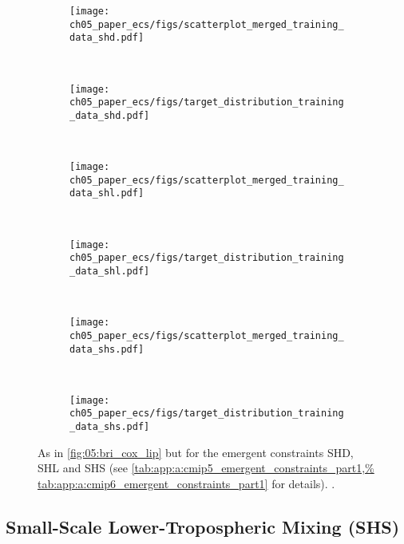\begin{figure}[!t]
  \centering
  \begin{subfigure}[b]{\SubfigureWidth{}}
    \texttt{[image: 
      ch05\_paper\_ecs/figs/scatterplot\_merged\_training\_data\_shd.pdf]}
    \caption{}
    \label{fig:05:shd_shl_shs:a}
  \end{subfigure}
  ~
  \begin{subfigure}[b]{\SubfigureWidth{}}
    \texttt{[image: 
      ch05\_paper\_ecs/figs/target\_distribution\_training\_data\_shd.pdf]}
    \caption{}
    \label{fig:05:shd_shl_shs:b}
  \end{subfigure}
  \\
  \begin{subfigure}[b]{\SubfigureWidth{}}
    \texttt{[image: 
      ch05\_paper\_ecs/figs/scatterplot\_merged\_training\_data\_shl.pdf]}
    \caption{}
    \label{fig:05:shd_shl_shs:c}
  \end{subfigure}
  ~
  \begin{subfigure}[b]{\SubfigureWidth{}}
    \texttt{[image: 
      ch05\_paper\_ecs/figs/target\_distribution\_training\_data\_shl.pdf]}
    \caption{}
    \label{fig:05:shd_shl_shs:d}
  \end{subfigure}
  \\
  \begin{subfigure}[b]{\SubfigureWidth{}}
    \texttt{[image: 
      ch05\_paper\_ecs/figs/scatterplot\_merged\_training\_data\_shs.pdf]}
    \caption{}
    \label{fig:05:shd_shl_shs:e}
  \end{subfigure}
  ~
  \begin{subfigure}[b]{\SubfigureWidth{}}
    \texttt{[image: 
      ch05\_paper\_ecs/figs/target\_distribution\_training\_data\_shs.pdf]}
    \caption{}
    \label{fig:05:shd_shl_shs:f}
  \end{subfigure}
  \caption{As in \cref{fig:05:bri_cox_lip} but for the emergent constraints
    SHD, SHL and SHS (see \cref{tab:app:a:cmip5_emergent_constraints_part1,%
      tab:app:a:cmip6_emergent_constraints_part1} for details).
    .}
  \label{fig:05:shd_shl_shs}
\end{figure}


\subsection{Small-Scale Lower-Tropospheric Mixing (SHS)}
\label{subsec:05:shs}

